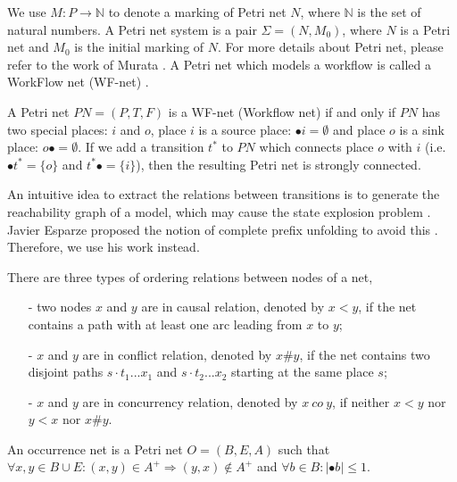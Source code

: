 \documentclass{llncs}
\begin{document}
We use $M:P\rightarrow\mathbb{N}$ to denote a marking of Petri net $N$, where $\mathbb{N}$ is the set of natural numbers. A Petri net system is a pair $\Sigma=(N,M_{0})$, where $N$ is a Petri net and $M_{0}$ is the initial marking of $N$. For more details about Petri net, please refer to the work of Murata \cite{murata1989petri}. A Petri net which models a workflow is called a WorkFlow net (WF-net) \cite{van1998application}.

\begin{definition}[WF-net]\label{def:wfnet}
A Petri net $PN=(P,T,F)$ is a WF-net (Workflow net) if and only if $PN$ has two special places: $i$ and $o$, place $i$ is a source place: $\bullet i=\emptyset$ and place $o$ is a sink place: $o\bullet =\emptyset$. If we add a transition $t^{*}$ to $PN$ which connects place $o$ with $i$ (i.e. $\bullet t^{*}=\{o\}$ and $t^{*}\bullet=\{i\}$), then the resulting Petri net is strongly connected.
\end{definition}

An intuitive idea to extract the relations between transitions is to generate the reachability graph of a model, which may cause the state explosion problem \cite{mcmillan1995technique}. Javier Esparze proposed the notion of complete prefix unfolding to avoid this \cite{esparza1996improvement}. Therefore, we use his work instead.

\begin{definition}\label{def:orderingRelations}
There are three types of ordering relations between nodes of a net,
	\begin{itemize}
		\item[-] two nodes $x$ and $y$ are in causal relation, denoted by $x<y$, if the net contains a path with at least one arc leading from $x$ to $y$;
		\item[-] $x$ and $y$ are in conflict relation, denoted by $x\#y$, if the net contains two disjoint paths $s\cdot t_{1}...x_{1}$ and $s\cdot t_{2}...x_{2}$ starting at the same place $s$;
		\item[-] $x$ and $y$ are in concurrency relation, denoted by $x~co~y$, if neither $x<y$ nor $y<x$ nor $x\#y$.
	\end{itemize}
\end{definition}

\begin{definition}\label{def:occurrenceNet}
An occurrence net is a Petri net $O=(B,E,A)$ such that $\forall x,y\in B\cup E:(x,y)
\in A^{+}\Rightarrow(y,x)\notin A^{+}$ and $\forall b\in B:|\bullet b|\leq 1$.
\end{definition}
\end{document}
